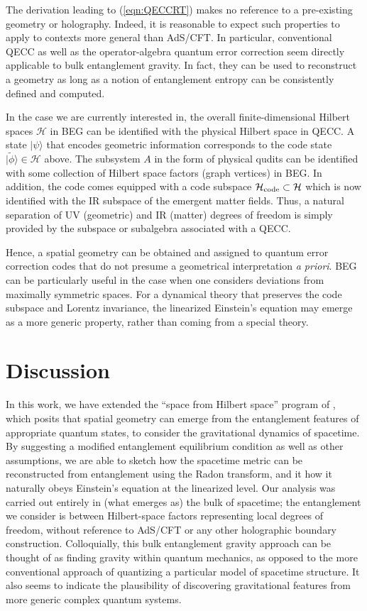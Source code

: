 \documentclass[%
preprint,
nofootinbib,
amsmath,amssymb,
aps,
prd,
showpacs,
superscriptaddress
]{revtex4-1}
\begin{document}
The derivation leading to (\ref{eqn:QECCRT}) makes no reference to a pre-existing geometry or holography. Indeed, it is reasonable to expect such properties to apply to contexts more general than AdS/CFT.  
In particular, conventional QECC as well as the operator-algebra quantum error correction seem directly applicable to bulk entanglement gravity. In fact, they can be used to reconstruct a geometry as long as a notion of entanglement entropy can be consistently defined and computed.  

In the case we are currently interested in, the overall finite-dimensional Hilbert spaces $\mathcal{H}$ in BEG can be identified with the physical Hilbert space in QECC. 
A state $|\psi\rangle$ that encodes geometric information corresponds to the code state $|\tilde{\phi}\rangle\in\mathcal{H}$ above. 
The subsystem $A$ in the form of physical qudits can be identified with some collection of Hilbert space factors (graph vertices) in BEG. 
In addition, the code comes equipped with a code subspace $\mathcal{H}_{\rm code}\subset \mathcal{H}$ which is now identified with the IR subspace of the emergent matter fields. Thus, a natural separation of UV (geometric) and IR (matter) degrees of freedom is simply provided by the subspace or subalgebra associated with a QECC.

Hence, a spatial geometry can be obtained and assigned to quantum error correction codes that do not presume a geometrical interpretation \emph{a priori}. BEG can be particularly useful in the case when one considers deviations from maximally symmetric spaces. For a dynamical theory that preserves the code subspace and Lorentz invariance, the linearized Einstein's equation may emerge as a more generic property, rather than coming from a special theory. 



\section{Discussion}

In this work, we have extended the ``space from Hilbert space'' program of \cite{Cao:2016mst}, which posits that spatial geometry can emerge from the entanglement features of appropriate quantum states, to consider the gravitational dynamics of spacetime.
By suggesting a modified entanglement equilibrium condition as well as other assumptions, we are able to sketch how the spacetime metric can be reconstructed from entanglement using the Radon transform, and it how it naturally obeys Einstein's equation at the linearized level.
Our analysis was carried out entirely in (what emerges as) the bulk of spacetime; the entanglement we consider is between Hilbert-space factors representing local degrees of freedom, without reference to AdS/CFT or any other holographic boundary construction.
Colloquially, this bulk entanglement gravity approach can be thought of as finding gravity within quantum mechanics, as opposed to the more conventional approach of quantizing a particular model of spacetime structure.
It also seems to indicate the plausibility of discovering gravitational features from more generic complex quantum systems.
\end{document}

